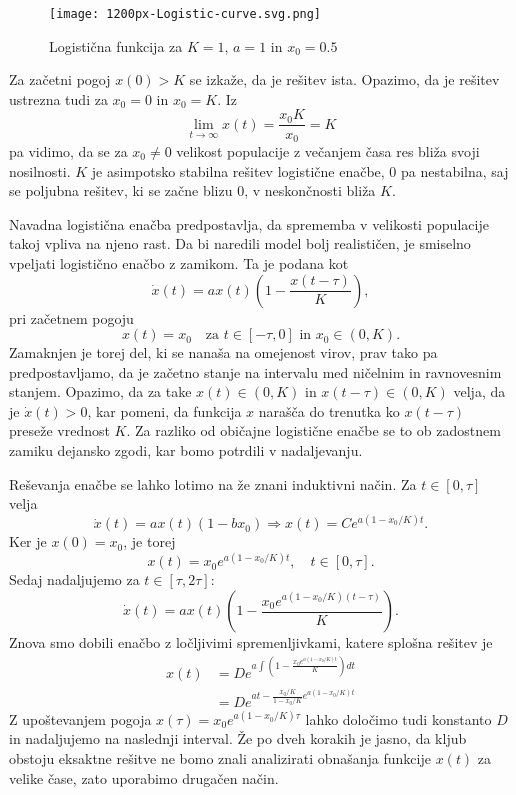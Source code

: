 \documentclass[12pt,a4paper]{amsart}
\theoremstyle{definition} %
\theoremstyle{plain} %
\begin{document}
\begin{figure}[h]
    \texttt{[image: 1200px-Logistic-curve.svg.png]}
    \caption{Logistična funkcija za $K=1$, $a=1$ in $x_0=0.5$}
\end{figure}

\noindent Za začetni pogoj $x(0)>K$ se izkaže, da je rešitev ista.
Opazimo, da je rešitev ustrezna tudi za $x_0=0$ in $x_0=K$. Iz 
\[\lim_{t\to\infty}x(t)=\frac{x_0K}{x_0}=K\]
pa vidimo, da se za $x_0\neq0$ velikost populacije z večanjem časa res bliža svoji nosilnosti. $K$ je asimpotsko stabilna 
rešitev logistične enačbe, 0 pa nestabilna, saj se poljubna rešitev, ki se začne blizu 0, v neskončnosti bliža $K$.


Navadna logistična enačba predpostavlja, da sprememba v velikosti populacije takoj vpliva na njeno rast. Da bi naredili 
model bolj realističen, je smiselno vpeljati logistično enačbo z zamikom. Ta je podana kot 
\[\dot{x}(t)=ax(t)\left(1-\frac{x(t-\tau)}{K}\right),\]
pri začetnem pogoju 
\[x(t)=x_0\quad\text{za }t\in[-\tau,0] \text{ in }x_0\in(0,K).\]
Zamaknjen je torej del, ki se nanaša na omejenost virov, prav tako pa predpostavljamo, da je začetno stanje na intervalu
med ničelnim in ravnovesnim stanjem. Opazimo, da za take $x(t)\in(0,K)$ in $x(t-\tau)\in(0,K)$ velja, da je
$\dot{x}(t)>0$, kar pomeni, da funkcija $x$ narašča do trenutka ko $x(t-\tau)$ preseže vrednost $K$. Za razliko od 
običajne logistične enačbe se to ob zadostnem zamiku dejansko zgodi, kar bomo potrdili v nadaljevanju.

Reševanja enačbe se lahko lotimo na že znani induktivni način. Za $t\in[0,\tau]$ velja 
\[\dot{x}(t)=ax(t)(1-bx_0) \Rightarrow x(t)=Ce^{a(1-x_0/K)t}.\]
Ker je $x(0)=x_0$, je torej 
\[x(t)=x_0e^{a(1-x_0/K)t}, \quad t\in[0,\tau].\]
Sedaj nadaljujemo za $t\in[\tau,2\tau]$:
\[\dot{x}(t)=ax(t)\left(1-\frac{x_0e^{a(1-x_0/K)(t-\tau)}}{K}\right).\]
Znova smo dobili enačbo z ločljivimi spremenljivkami, katere splošna rešitev je 
\begin{equation*}
    \begin{split}
        x(t) &= De^{a\int(1-\frac{x_0e^{a(1-x_0/K)t}}{K})dt} \\
             &= De^{at-\frac{x_0/K}{1-x_0/K}e^{a(1-x_0/K)t}}
    \end{split}
\end{equation*}
Z upoštevanjem pogoja $x(\tau)=x_0e^{a(1-x_0/K)\tau}$ lahko določimo tudi konstanto $D$ in nadaljujemo na naslednji 
interval. Že po dveh korakih je jasno, da kljub obstoju eksaktne rešitve ne bomo znali analizirati obnašanja funkcije 
$x(t)$ za velike čase, zato uporabimo drugačen način.
\end{document}
